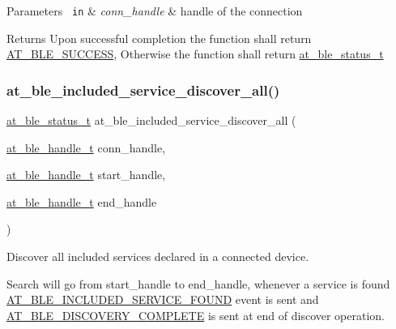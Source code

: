 \begin{DoxyParams}[1]{Parameters}
\mbox{\texttt{ in}}  & {\em conn\+\_\+handle} & handle of the connection\\
\hline
\end{DoxyParams}
\begin{DoxyReturn}{Returns}
Upon successful completion the function shall return \mbox{\hyperlink{group__error__codes__group_gga3b1db9b95feb157b3c188ca27fe76988a7e3bfff5387331cd4f2c56cbcbbd7e19}{A\+T\+\_\+\+B\+L\+E\+\_\+\+S\+U\+C\+C\+E\+SS}}, Otherwise the function shall return \mbox{\hyperlink{at__ble__api_8h_ace24eb4e5ca3f325c663b809da5feb92}{at\+\_\+ble\+\_\+status\+\_\+t}} 
\end{DoxyReturn}
\mbox{\label{group__gatt__client__group_ga1937df46ff17c4490585d1ca540bc8fe}} 
\subsubsection{\texorpdfstring{at\_ble\_included\_service\_discover\_all()}{at\_ble\_included\_service\_discover\_all()}}
{\footnotesize\ttfamily \mbox{\hyperlink{group__error__codes__group_ga3b1db9b95feb157b3c188ca27fe76988}{at\+\_\+ble\+\_\+status\+\_\+t}} at\+\_\+ble\+\_\+included\+\_\+service\+\_\+discover\+\_\+all (\begin{DoxyParamCaption}\item[{\mbox{\hyperlink{at__ble__api_8h_abd23646d0c662860741f787efc8456f2}{at\+\_\+ble\+\_\+handle\+\_\+t}}}]{conn\+\_\+handle,  }\item[{\mbox{\hyperlink{at__ble__api_8h_abd23646d0c662860741f787efc8456f2}{at\+\_\+ble\+\_\+handle\+\_\+t}}}]{start\+\_\+handle,  }\item[{\mbox{\hyperlink{at__ble__api_8h_abd23646d0c662860741f787efc8456f2}{at\+\_\+ble\+\_\+handle\+\_\+t}}}]{end\+\_\+handle }\end{DoxyParamCaption})}



Discover all included services declared in a connected device. 

Search will go from start\+\_\+handle to end\+\_\+handle, whenever a service is found \mbox{\hyperlink{at__ble__api_8h_a3324640b95f33169515f89738ed5baebac1056aa659844d1455c7be27a2d23626}{A\+T\+\_\+\+B\+L\+E\+\_\+\+I\+N\+C\+L\+U\+D\+E\+D\+\_\+\+S\+E\+R\+V\+I\+C\+E\+\_\+\+F\+O\+U\+ND}} event is sent and \mbox{\hyperlink{at__ble__api_8h_a3324640b95f33169515f89738ed5baeba8229c390a23c583fa2971431fae60717}{A\+T\+\_\+\+B\+L\+E\+\_\+\+D\+I\+S\+C\+O\+V\+E\+R\+Y\+\_\+\+C\+O\+M\+P\+L\+E\+TE}} is sent at end of discover operation.


